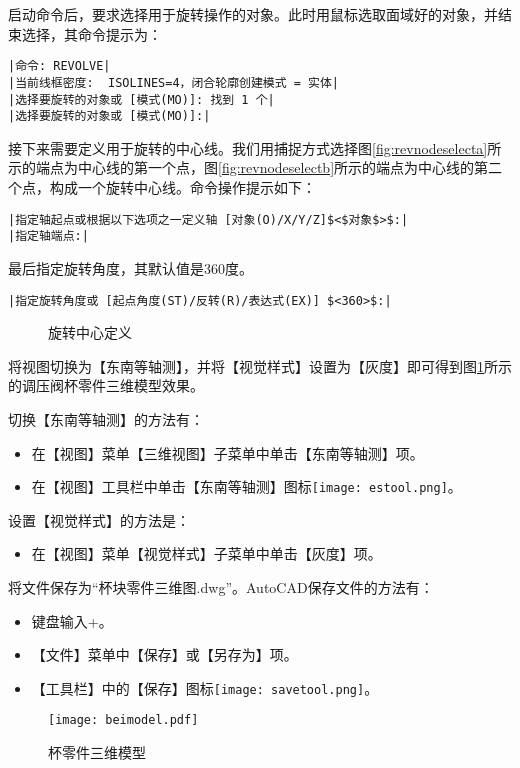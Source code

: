 \begin{procedure}
启动命令后，要求选择用于旋转操作的对象。此时用鼠标选取面域好的对象，并结束选择，其命令提示为：
\begin{lstlisting}
|命令: REVOLVE|
|当前线框密度:  ISOLINES=4，闭合轮廓创建模式 = 实体|
|选择要旋转的对象或 [模式(MO)]: 找到 1 个|
|选择要旋转的对象或 [模式(MO)]:|
\end{lstlisting}
接下来需要定义用于旋转的中心线。我们用捕捉方式选择图\ref{fig:revnodeselecta}所示的端点为中心线的第一个点，图\ref{fig:revnodeselectb}所示的端点为中心线的第二个点，构成一个旋转中心线。命令操作提示如下：
\begin{lstlisting}
|指定轴起点或根据以下选项之一定义轴 [对象(O)/X/Y/Z]$<$对象$>$:|
|指定轴端点:|
\end{lstlisting}
最后指定旋转角度，其默认值是360度。
\begin{lstlisting}
|指定旋转角度或 [起点角度(ST)/反转(R)/表达式(EX)] $<360>$:|
\end{lstlisting}

\begin{figure}[htbp]
\centering
{}\hspace{30pt}
\caption{旋转中心定义}
\end{figure}
\item 将视图切换为【东南等轴测】，并将【视觉样式】设置为【灰度】即可得到图\ref{fig:beimodel}所示的调压阀杯零件三维模型效果。

切换【东南等轴测】的方法有：
\begin{itemize}
\item 在【视图】菜单【三维视图】子菜单中单击【东南等轴测】项。
\item 在【视图】工具栏中单击【东南等轴测】图标\texttt{[image: estool.png]}。
\end{itemize}
设置【视觉样式】的方法是：
\begin{itemize}
\item 在【视图】菜单【视觉样式】子菜单中单击【灰度】项。
\end{itemize}
\item 将文件保存为“杯块零件三维图.dwg”。AutoCAD保存文件的方法有：
\begin{itemize}
\item 键盘输入+。
\item 【文件】菜单中【保存】或【另存为】项。
\item 【工具栏】中的【保存】图标\texttt{[image: savetool.png]}。
\end{itemize}
\end{procedure}
\begin{figure}
\centering
\texttt{[image: beimodel.pdf]}
\caption{杯零件三维模型}\label{fig:beimodel}
\end{figure}

